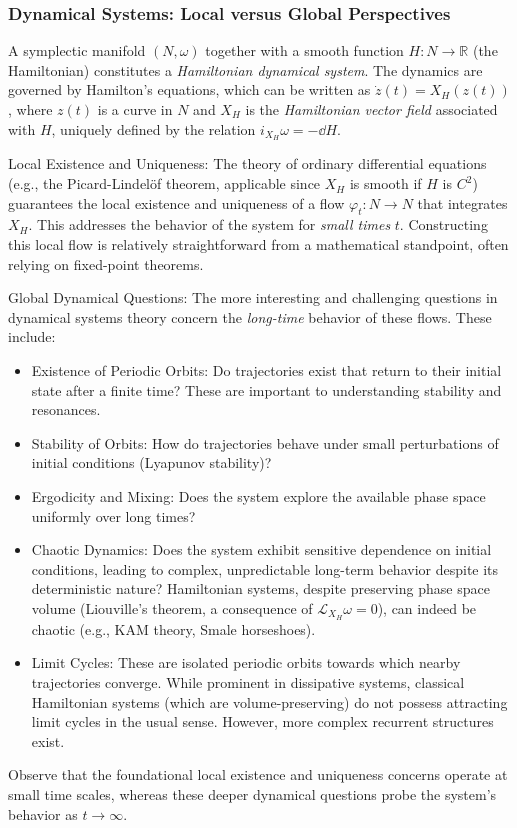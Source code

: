 \subsubsection{Dynamical Systems: Local versus Global Perspectives}

\begin{remark} \label{rem:1.24}
A symplectic manifold $(N, \omega)$ together with a smooth function $H:N\rightarrow\mathbb{R}$ (the Hamiltonian) constitutes a \emph{Hamiltonian dynamical system}. The dynamics are governed by Hamilton's equations, which can be written as $\dot{z}(t) = X_H(z(t))$, where $z(t)$ is a curve in $N$ and $X_H$ is the \emph{Hamiltonian vector field} associated with $H$, uniquely defined by the relation $i_{X_H}\omega = -\dd H$.

Local Existence and Uniqueness: The theory of ordinary differential equations (e.g., the Picard-Lindelöf theorem, applicable since $X_H$ is smooth if $H$ is $C^2$) guarantees the local existence and uniqueness of a flow $\varphi_t: N \to N$ that integrates $X_H$. This addresses the behavior of the system for \emph{small times} $t$. Constructing this local flow is relatively straightforward from a mathematical standpoint, often relying on fixed-point theorems.

Global Dynamical Questions: The more interesting and challenging questions in dynamical systems theory concern the \emph{long-time} behavior of these flows. These include:
\begin{itemize}
\item Existence of Periodic Orbits: Do trajectories exist that return to their initial state after a finite time? These are important to understanding stability and resonances.
\item Stability of Orbits: How do trajectories behave under small perturbations of initial conditions (Lyapunov stability)?
\item Ergodicity and Mixing: Does the system explore the available phase space uniformly over long times?
\item Chaotic Dynamics: Does the system exhibit sensitive dependence on initial conditions, leading to complex, unpredictable long-term behavior despite its deterministic nature? Hamiltonian systems, despite preserving phase space volume (Liouville's theorem, a consequence of $\mathcal{L}_{X_H}\omega = 0$), can indeed be chaotic (e.g., KAM theory, Smale horseshoes).
\item Limit Cycles: These are isolated periodic orbits towards which nearby trajectories converge. While prominent in dissipative systems, classical Hamiltonian systems (which are volume-preserving) do not possess attracting limit cycles in the usual sense. However, more complex recurrent structures exist.
\end{itemize}
Observe that the foundational local existence and uniqueness concerns operate at small time scales, whereas these deeper dynamical questions probe the system's behavior as $t \to \infty$.


\end{remark}
